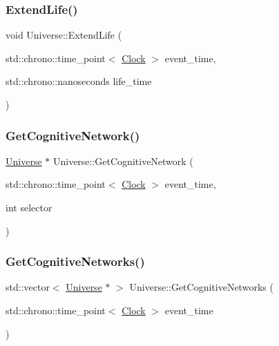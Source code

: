 \subsubsection{\texorpdfstring{Extend\+Life()}{ExtendLife()}}
{\footnotesize\ttfamily void Universe\+::\+Extend\+Life (\begin{DoxyParamCaption}\item[{std\+::chrono\+::time\+\_\+point$<$ \mbox{\hyperlink{universe_8h_a0ef8d951d1ca5ab3cfaf7ab4c7a6fd80}{Clock}} $>$}]{event\+\_\+time,  }\item[{std\+::chrono\+::nanoseconds}]{life\+\_\+time }\end{DoxyParamCaption})}

\mbox{\label{classUniverse_a1ea2b7e438bfdc7dd599aa59c310b126}} 
\subsubsection{\texorpdfstring{Get\+Cognitive\+Network()}{GetCognitiveNetwork()}}
{\footnotesize\ttfamily \mbox{\hyperlink{classUniverse}{Universe}} $\ast$ Universe\+::\+Get\+Cognitive\+Network (\begin{DoxyParamCaption}\item[{std\+::chrono\+::time\+\_\+point$<$ \mbox{\hyperlink{universe_8h_a0ef8d951d1ca5ab3cfaf7ab4c7a6fd80}{Clock}} $>$}]{event\+\_\+time,  }\item[{int}]{selector }\end{DoxyParamCaption})}

\mbox{\label{classUniverse_a06968a24194280a43f077c5b77379ea8}} 
\subsubsection{\texorpdfstring{Get\+Cognitive\+Networks()}{GetCognitiveNetworks()}}
{\footnotesize\ttfamily std\+::vector$<$ \mbox{\hyperlink{classUniverse}{Universe}} $\ast$ $>$ Universe\+::\+Get\+Cognitive\+Networks (\begin{DoxyParamCaption}\item[{std\+::chrono\+::time\+\_\+point$<$ \mbox{\hyperlink{universe_8h_a0ef8d951d1ca5ab3cfaf7ab4c7a6fd80}{Clock}} $>$}]{event\+\_\+time }\end{DoxyParamCaption})}

